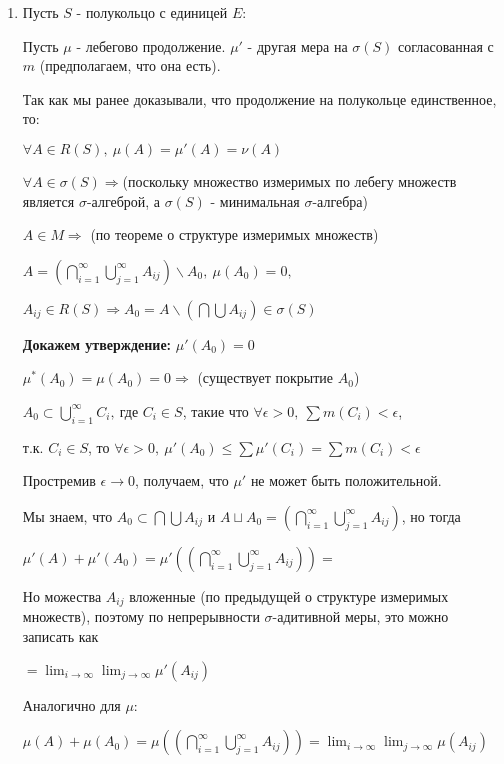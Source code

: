 \begin{enumerate}

\item Пусть $S$ - полукольцо с единицей $E$:

Пусть $\mu$ - лебегово продолжение. $\mu'$ - другая мера на $\sigma(S)$ согласованная с $m$ (предполагаем, что она есть).

Так как мы ранее доказывали, что продолжение на полукольце единственное, то:

$\forall A \in R(S), \ \mu(A) = \mu'(A) = \nu(A)$

$\forall A \in \sigma(S) \Rightarrow$(поскольку множество измеримых по лебегу множеств является $\sigma$-алгеброй, а $\sigma(S)$ - минимальная $\sigma$-алгебра)

$A \in M \Rightarrow$ (по теореме о структуре измеримых множеств)

$A = (\bigcap_{i=1}^{\infty} \bigcup_{j=1}^{\infty} A_{ij}) \backslash A_0,\ \mu(A_0) = 0,$

$A_{ij} \in R(S) \Rightarrow A_0 = A \backslash (\bigcap \bigcup A_{ij}) \in \sigma(S)$

\textbf{Докажем утверждение:} $\mu'(A_0) = 0$

\Proof
$\mu^*(A_0) = \mu(A_0) = 0 \Rightarrow$ (существует покрытие $A_0$)

$A_0 \subset \bigcup^{\infty}_{i=1} C_i,\ $где $ C_i \in S$, такие что $\forall \epsilon > 0,\ \sum m(C_i) < \epsilon$, 

т.к. $C_i \in S$, то $\forall \epsilon > 0,\ \mu'(A_0) \leq \sum \mu'(C_i) = \sum m(C_i) < \epsilon$

Простремив $\epsilon \rightarrow 0$, получаем, что $\mu'$ не может быть положительной. 

\EndProof

Мы знаем, что $A_0 \subset \bigcap \bigcup A_{ij}$ и $A \sqcup A_0 = (\bigcap_{i=1}^{\infty} \bigcup_{j=1}^{\infty} A_{ij})$, но тогда

$\mu'(A) + \mu'(A_0) = \mu'((\bigcap_{i=1}^{\infty} \bigcup_{j=1}^{\infty} A_{ij})) =$

Но можества $A_{ij}$ вложенные (по предыдущей о структуре измеримых множеств), поэтому по непрерывности $\sigma$-адитивной меры, это можно записать как

$= \lim_{i \rightarrow \infty} \lim_{j \rightarrow \infty} \mu'(A_{ij})$ 

Аналогично для $\mu$:

$\mu(A) + \mu(A_0) = \mu((\bigcap_{i=1}^{\infty} \bigcup_{j=1}^{\infty} A_{ij})) = \lim_{i \rightarrow \infty} \lim_{j \rightarrow \infty} \mu(A_{ij})$ 


\end{enumerate}
